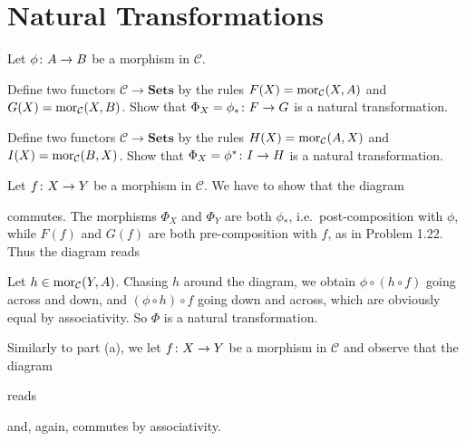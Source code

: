 \section{Natural Transformations}

\bp
Let $\phi \colon A \to B$ be a morphism in $\mathcal{C}$.
\ben[label=(\alph*)]
\item Define two functors $\mathcal{C} \to \mathbf{Sets}$ by the rules $F(X) = \operatorname{mor}_{\mathcal{C}}(X,A)$ and $G(X) = \operatorname{mor}_{\mathcal{C}}(X,B)$. Show that $\Phi_X = \phi_* \colon F \to G$ is a natural transformation.
\item Define two functors $\mathcal{C} \to \mathbf{Sets}$ by the rules $H(X) = \operatorname{mor}_{\mathcal{C}}(A,X)$ and $I(X) = \operatorname{mor}_{\mathcal{C}}(B,X)$. Show that $\Phi_X = \phi^* \colon I \to H$ is a natural transformation.
\een
\ep

\bs
\ben[label=(\alph*)]
\item Let $f\colon X\to Y$ be a morphism in $\mathcal{C}$. We have to show that the diagram
\bse
{}
\ese
commutes. The morphisms $\Phi_X$ and $\Phi_Y$ are both $\phi_*$, i.e.\ post-composition with $\phi$, while $F(f)$ and $G(f)$ are both pre-composition with $f$, as in Problem 1.22. Thus the diagram reads
\bse
{}
\ese
Let $h\in\operatorname{mor}_{\mathcal{C}}(Y,A)$. Chasing $h$ around the diagram, we obtain $\phi\circ(h\circ f)$ going across and down, and $(\phi \circ h)\circ f$ going down and across, which are obviously equal by associativity. So $\Phi$ is a natural transformation.
\item Similarly to part (a), we let $f\colon X\to Y$ be a morphism in $\mathcal{C}$ and observe that the diagram
\bse
{}
\ese
reads
\bse
{}
\ese
and, again, commutes by associativity. 
\een
\es

